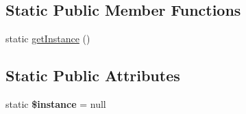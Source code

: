 \subsection*{Static Public Member Functions}
\begin{DoxyCompactItemize}
\item 
static \hyperlink{class_anemo_1_1_application_1_1_http_1_1_request_ac93fbec81f07e5d15f80db907e63dc10}{getInstance} ()
\end{DoxyCompactItemize}
\subsection*{Static Public Attributes}
\begin{DoxyCompactItemize}
\item 
\hypertarget{class_anemo_1_1_application_1_1_http_1_1_request_ad9d7ce33ebb142b70e58b68052ca0ea8}{
static {\bfseries \$instance} = null}
\label{class_anemo_1_1_application_1_1_http_1_1_request_ad9d7ce33ebb142b70e58b68052ca0ea8}

\end{DoxyCompactItemize}
